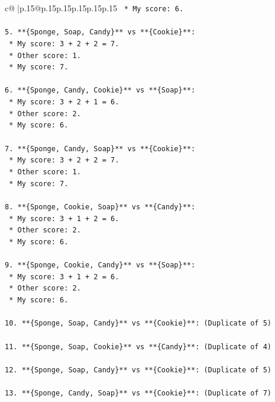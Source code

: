 \documentclass{article}
\begin{document}
{\begin{supertabular}{c@{$\;$}|p{.15\linewidth}@{}p{.15\linewidth}p{.15\linewidth}p{.15\linewidth}p{.15\linewidth}p{.15\linewidth}}
{{{\texttt{    *   My score: 6.} \\
\\ 
\texttt{5.  **\{Sponge, Soap, Candy\}** vs **\{Cookie\}**:} \\
\texttt{    *   My score: 3 + 2 + 2 = 7.} \\
\texttt{    *   Other score: 1.} \\
\texttt{    *   My score: 7.} \\
\\ 
\texttt{6.  **\{Sponge, Candy, Cookie\}** vs **\{Soap\}**:} \\
\texttt{    *   My score: 3 + 2 + 1 = 6.} \\
\texttt{    *   Other score: 2.} \\
\texttt{    *   My score: 6.} \\
\\ 
\texttt{7.  **\{Sponge, Candy, Soap\}** vs **\{Cookie\}**:} \\
\texttt{    *   My score: 3 + 2 + 2 = 7.} \\
\texttt{    *   Other score: 1.} \\
\texttt{    *   My score: 7.} \\
\\ 
\texttt{8.  **\{Sponge, Cookie, Soap\}** vs **\{Candy\}**:} \\
\texttt{    *   My score: 3 + 1 + 2 = 6.} \\
\texttt{    *   Other score: 2.} \\
\texttt{    *   My score: 6.} \\
\\ 
\texttt{9.  **\{Sponge, Cookie, Candy\}** vs **\{Soap\}**:} \\
\texttt{    *   My score: 3 + 1 + 2 = 6.} \\
\texttt{    *   Other score: 2.} \\
\texttt{    *   My score: 6.} \\
\\ 
\texttt{10. **\{Sponge, Soap, Candy\}** vs **\{Cookie\}**: (Duplicate of 5)} \\
\\ 
\texttt{11. **\{Sponge, Soap, Cookie\}** vs **\{Candy\}**: (Duplicate of 4)} \\
\\ 
\texttt{12. **\{Sponge, Soap, Candy\}** vs **\{Cookie\}**: (Duplicate of 5)} \\
\\ 
\texttt{13. **\{Sponge, Candy, Soap\}** vs **\{Cookie\}**: (Duplicate of 7)} \\
}}}
\end{supertabular}}
\end{document}
